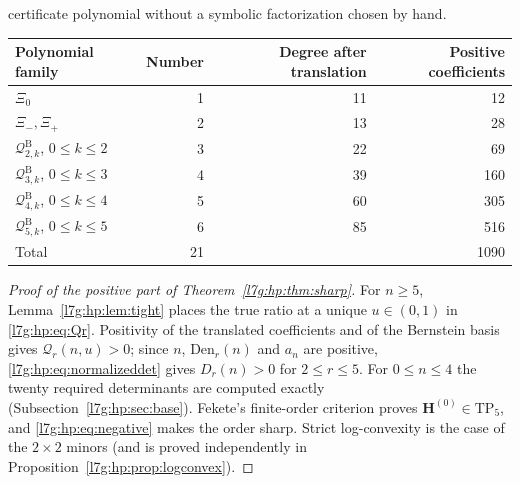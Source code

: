 \documentclass[11pt,letterpaper]{article}
\theoremstyle{remark}\newtheorem{remark}[theorem]{Remark}
\newcommand{\TP}{\mathrm{TP}}\newcommand{\TN}{\mathrm{TN}}
\newcounter{l7gtrsavedeq}
\begin{document}
certificate polynomial without a symbolic factorization chosen by hand.
\begin{center}\small
\begin{tabular}{lrrr}
\toprule
Polynomial family & Number & Degree after translation & Positive coefficients\\
\midrule
$\Xi_0$ & 1 & 11 & 12\\
$\Xi_-,\Xi_+$ & 2 & 13 & 28\\
$\mathcal Q^{\mathrm B}_{2,k}$, $0\le k\le2$ & 3 & 22 & 69\\
$\mathcal Q^{\mathrm B}_{3,k}$, $0\le k\le3$ & 4 & 39 & 160\\
$\mathcal Q^{\mathrm B}_{4,k}$, $0\le k\le4$ & 5 & 60 & 305\\
$\mathcal Q^{\mathrm B}_{5,k}$, $0\le k\le5$ & 6 & 85 & 516\\
\midrule
Total & 21 & & 1090\\
\bottomrule
\end{tabular}
\end{center}

\begin{proof}[Proof of the positive part of Theorem~\ref{l7g:hp:thm:sharp}]
For $n\ge5$, Lemma~\ref{l7g:hp:lem:tight} places the true ratio at a unique
$u\in(0,1)$ in \eqref{l7g:hp:eq:Qr}. Positivity of the translated
coefficients and of the Bernstein basis gives $\mathcal Q_r(n,u)>0$; since
$n$, $\mathrm{Den}_r(n)$ and $a_n$ are positive,
\eqref{l7g:hp:eq:normalizeddet} gives $D_r(n)>0$ for $2\le r\le5$. For
$0\le n\le4$ the twenty required determinants are computed exactly
(Subsection~\ref{l7g:hp:sec:base}). Fekete's finite-order criterion proves
$\mathbf H^{(0)}\in\TP_5$, and \eqref{l7g:hp:eq:negative} makes the order
sharp. Strict log-convexity is the case of the $2\times2$ minors (and is
proved independently in Proposition~\ref{l7g:hp:prop:logconvex}).
\end{proof}
\end{document}
